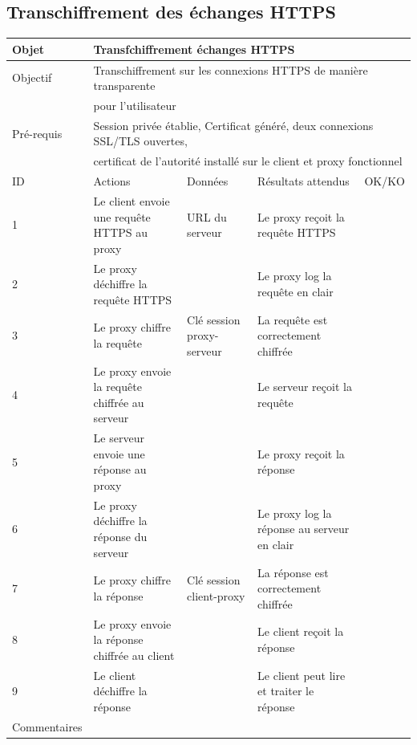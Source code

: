 \documentclass[a4paper,11pt,french]{article}
\begin{document}
\newpage


\subsection{Transchiffrement des échanges HTTPS}

\begin{tabular}{|m{2.5cm}|m{4cm}|m{3cm}|m{3.5cm}|m{2cm}|}
\hline 
\rowcolor{Blue} Objet & \multicolumn{4}{|l|}{Transfchiffrement échanges HTTPS} \\ 
\hline 
\rowcolor{Blue} Objectif & \multicolumn{4}{|l|}{Transchiffrement sur les connexions HTTPS de manière transparente} \\
\rowcolor{Blue} & \multicolumn{4}{|l|}{pour l'utilisateur} \\ 
\hline 
\rowcolor{Blue} Pré-requis & \multicolumn{4}{|l|}{Session privée établie, Certificat généré, deux connexions SSL/TLS ouvertes,} \\ 
\rowcolor{Blue} & \multicolumn{4}{|l|}{certificat de l'autorité installé sur le client et proxy fonctionnel} 
\\
\hline 
\rowcolor{Orange} ID & Actions & Données & Résultats attendus & OK/KO \\ 
\hline 
1 & Le client envoie une requête HTTPS au proxy & URL du serveur & Le proxy reçoit la requête HTTPS &  \\ 
\hline
2 & Le proxy déchiffre la requête HTTPS & & Le proxy log la requête en clair & \\
\hline
3 & Le proxy chiffre la requête & Clé session proxy-serveur & La requête est 
correctement chiffrée & \\
\hline
4 & Le proxy envoie la requête chiffrée au serveur & & Le serveur reçoit la requête & \\
\hline
5 & Le serveur envoie une réponse au proxy & & Le proxy reçoit la 
réponse & \\
\hline
6 & Le proxy déchiffre la réponse du serveur & & Le proxy log la réponse au 
serveur en clair & \\
\hline
7 & Le proxy chiffre la réponse & Clé session client-proxy & La réponse est 
correctement chiffrée & \\
\hline
8 & Le proxy envoie la réponse chiffrée au client & & Le client reçoit la réponse 
& \\
\hline
9 & Le client déchiffre la réponse & & Le client peut lire et traiter le réponse 
& \\
\hline
Commentaires & \multicolumn{4}{|l|}{} \\ 
\hline
\end{tabular}

\newpage
\end{document}
